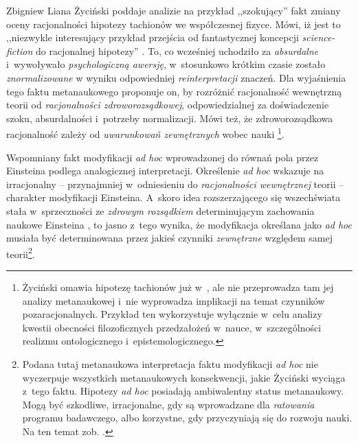 \begin{artplenv}{Zbigniew Liana}
Życiński poddaje analizie na przykład ,,szokujący'' fakt zmiany oceny racjonalności hipotezy tachionów we współczesnej
fizyce. Mówi, iż jest to ,,niezwykle interesujący przykład przejścia od fantastycznej koncepcji \textit{science-fiction}
do racjonalnej hipotezy''
\parencites[s.~129]{zycinski_structure_1988}[s.~228]{zycinski_struktura_2013}.
To, co wcześniej
uchodziło za \textit{absurdalne} i~wywoływało \textit{psychologiczną awersję}, w~stosunkowo krótkim czasie zostało
\textit{znormalizowane }w wyniku odpowiedniej \textit{reinterpretacji} znaczeń. Dla wyjaśnienia tego faktu metanaukowego
proponuje on, by rozróżnić racjonalność wewnętrzną teorii od \textit{racjonalności zdroworozsądkowej}, odpowiedzialnej za
doświadczenie szoku, absurdalności i~potrzeby normalizacji. Mówi też, że zdroworozsądkowa racjonalność zależy od
\textit{uwarunkowań zewnętrznych} wobec nauki
\parencites[s.~130]{zycinski_structure_1988}[s.~229n]{zycinski_struktura_2013}\footnote{Życiński omawia hipotezę tachionów już w~\parencite*[s.~175–176]{zycinski_teizm_1985},
ale nie przeprowadza tam jej analizy metanaukowej i~nie wyprowadza implikacji na temat czynników
pozaracjonalnych. Przykład ten wykorzystuje wyłącznie w~celu analizy kwestii obecności filozoficznych
przedzałożeń w~nauce, w~szczególności realizmu ontologicznego i~epistemologicznego.}.

Wspomniany fakt modyfikacji \textit{ad hoc} wprowadzonej do równań pola przez Einsteina
\parencite[zob.][s.~189]{zycinski_elementy_1996}
podlega analogicznej interpretacji. Określenie \textit{ad hoc} wskazuje na irracjonalny --
przynajmniej w~odniesieniu do \textit{racjonalności wewnętrznej} teorii -- charakter modyfikacji Einsteina. A~skoro idea
rozszerzającego się wszechświata stała w~sprzeczności ze \textit{zdrowym rozsądkiem} determinującym zachowania naukowe
Einsteina
\parencite[s.~249]{zycinski_jezyk_1983},
to jasno z~tego wynika, że modyfikacja określana
jako \textit{ad hoc} musiała być determinowana przez jakieś czynniki \textit{zewnętrzne} względem samej
teorii\footnote{Podana tutaj metanaukowa interpretacja faktu modyfikacji \textit{ad hoc} nie wyczerpuje wszystkich
metanaukowych konsekwencji, jakie Życiński wyciąga z~tego faktu. Hipotezy \textit{ad hoc} posiadają ambiwalentny status
metanaukowy. Mogą być szkodliwe, irracjonalne, gdy są wprowadzane dla \textit{ratowania} programu badawczego, albo
korzystne, gdy przyczyniają się do rozwoju nauki. Na ten temat zob.
\parencite[s.~162n]{zycinski_jezyk_1983}.
}.


\end{artplenv}

